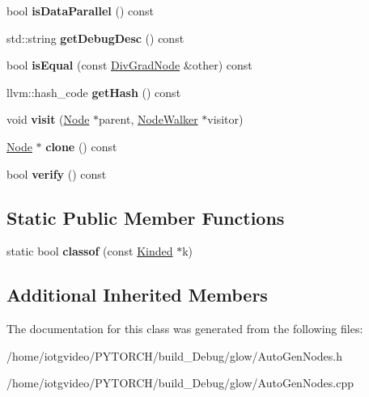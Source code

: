 \begin{DoxyCompactItemize}
bool {\bfseries is\+Data\+Parallel} () const
\item 
\mbox{\label{classglow_1_1_div_grad_node_af913d30d865fa356c89920b19282e9b5}} 
std\+::string {\bfseries get\+Debug\+Desc} () const
\item 
\mbox{\label{classglow_1_1_div_grad_node_ada4e718e17ffdca09cbc0cbec7f8b8a7}} 
bool {\bfseries is\+Equal} (const \hyperlink{classglow_1_1_div_grad_node}{Div\+Grad\+Node} \&other) const
\item 
\mbox{\label{classglow_1_1_div_grad_node_a00495b3c83147726ec9e9eb661521d31}} 
llvm\+::hash\+\_\+code {\bfseries get\+Hash} () const
\item 
\mbox{\label{classglow_1_1_div_grad_node_a7a97b7754a2bf6b104b49263b921b920}} 
void {\bfseries visit} (\hyperlink{classglow_1_1_node}{Node} $\ast$parent, \hyperlink{classglow_1_1_node_walker}{Node\+Walker} $\ast$visitor)
\item 
\mbox{\label{classglow_1_1_div_grad_node_a85d92b9a146efe6b167c854e4ea36b56}} 
\hyperlink{classglow_1_1_node}{Node} $\ast$ {\bfseries clone} () const
\item 
\mbox{\label{classglow_1_1_div_grad_node_aa39ef886dfa03059ed4e49ba3550225c}} 
bool {\bfseries verify} () const
\end{DoxyCompactItemize}
\subsection*{Static Public Member Functions}
\begin{DoxyCompactItemize}
\item 
\mbox{\label{classglow_1_1_div_grad_node_a06c1f837489aca511d8513171f105c8f}} 
static bool {\bfseries classof} (const \hyperlink{classglow_1_1_kinded}{Kinded} $\ast$k)
\end{DoxyCompactItemize}
\subsection*{Additional Inherited Members}


The documentation for this class was generated from the following files\+:\begin{DoxyCompactItemize}
\item 
/home/iotgvideo/\+P\+Y\+T\+O\+R\+C\+H/build\+\_\+\+Debug/glow/Auto\+Gen\+Nodes.\+h\item 
/home/iotgvideo/\+P\+Y\+T\+O\+R\+C\+H/build\+\_\+\+Debug/glow/Auto\+Gen\+Nodes.\+cpp\end{DoxyCompactItemize}
